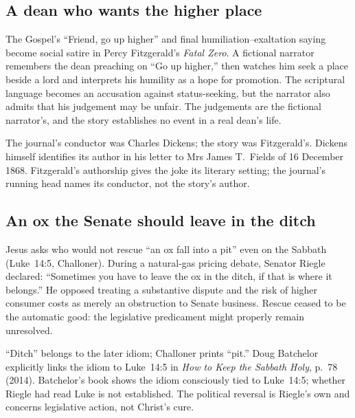 \subsection*{A dean who wants the higher place}
The Gospel's ``Friend, go up higher'' and final humiliation--exaltation saying become social satire in Percy Fitzgerald's \textit{Fatal Zero}. A fictional narrator remembers the dean preaching on ``Go up higher,'' then watches him seek a place beside a lord and interprets his humility as a hope for promotion. The scriptural language becomes an accusation against status-seeking, but the narrator also admits that his judgement may be unfair. The judgements are the fictional narrator's, and the story establishes no event in a real dean's life. 

The journal's conductor was Charles Dickens; the story was Fitzgerald's. Dickens himself identifies its author in his letter to Mrs James T.~Fields of 16 December 1868. Fitzgerald's authorship gives the joke its literary setting; the journal's running head names its conductor, not the story's author. 

\subsection*{An ox the Senate should leave in the ditch}
Jesus asks who would not rescue ``an ox fall into a pit'' even on the Sabbath (Luke~14:5, Challoner). During a natural-gas pricing debate, Senator Riegle declared: ``Sometimes you have to leave the ox in the ditch, if that is where it belongs.'' He opposed treating a substantive dispute and the risk of higher consumer costs as merely an obstruction to Senate business. Rescue ceased to be the automatic good: the legislative predicament might properly remain unresolved. 

``Ditch'' belongs to the later idiom; Challoner prints ``pit.'' Doug Batchelor explicitly links the idiom to Luke~14:5 in \textit{How to Keep the Sabbath Holy}, p.~78 (2014). Batchelor's book shows the idiom consciously tied to Luke~14:5; whether Riegle had read Luke is not established. The political reversal is Riegle's own and concerns legislative action, not Christ's cure.
